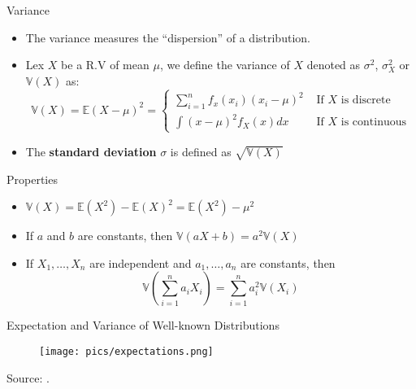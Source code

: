 \documentclass[handout]{beamer}
\begin{document}
\begin{frame}{Variance}
\scriptsize{
\begin{itemize}
 \item The variance measures the ``dispersion'' of a distribution.
 \item Lex $X$ be a R.V of mean $\mu$, we define the variance of $X$ denoted as $\sigma^2$, $\sigma^{2}_{X}$ or $\mathbb{V}(X)$ as:
  \begin{displaymath}
  \mathbb{V}(X) = \mathbb{E}(X - \mu)^2 =  \left\{ \begin{array}{rl}
  \sum_{i=1}^{n} f_{x}(x_{i})(x_{i} - \mu)^2 &\mbox{  If $X$ is discrete} \\
   \int (x- \mu)^{2}f_X(x)dx &\mbox{ If $X$ is continuous}
       \end{array} \right.
  \end{displaymath}
\item The \textbf{standard deviation} $\sigma$ is defined as $\sqrt{\mathbb{V}(X)}$ 
\end{itemize}

\begin{block}{Properties}
\begin{itemize}
\item $\mathbb{V}(X)=  \mathbb{E}(X^2)- \mathbb{E}(X)^2 =  \mathbb{E}(X^2)-\mu^2 $ 
\item If $a$ and $b$ are constants, then  $\mathbb{V}(aX+b)=a^2\mathbb{V}(X)$
\item If $X_1,\dots,X_n$ are independent and $a_1,\dots,a_n$ are constants, then
\begin{displaymath}
 \mathbb{V}\left(\sum_{i=1}^{n}a_i X_i \right) = \sum_{i=1}^{n} a_{i}^{2} \mathbb{V}(X_{i})
\end{displaymath}


\end{itemize}

 
\end{block}


}
\end{frame}

\begin{frame}{Expectation and Variance of Well-known Distributions}
 
\begin{figure}[h!]
	\centering
	\texttt{[image: pics/expectations.png]}
\end{figure} 
 
Source: \cite{wasserman2013all}.
 
\end{frame}
\end{document}
